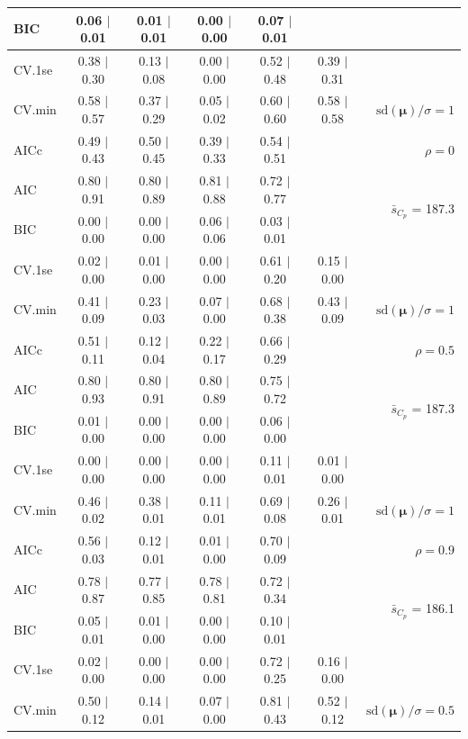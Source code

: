 \documentclass[12pt]{article}
\newcommand{\mr}[1]{\mathrm{#1}}
\newcommand{\bm}[1]{\mathbf{#1}}
\begin{document}
\begin{table}[p]
\begin{center}
\begin{tabular}{l*{5}{c}|r}
BIC & 0.06 $\mid$ 0.01 & 0.01 $\mid$ 0.01 & 0.00 $\mid$ 0.00 & 0.07 $\mid$ 0.01 & & \\
 \hline 
CV.1se & 0.38 $\mid$ 0.30 & 0.13 $\mid$ 0.08 & 0.00 $\mid$ 0.00 & 0.52 $\mid$ 0.48 & 0.39 $\mid$ 0.31 &\\
CV.min & 0.58 $\mid$ 0.57 & 0.37 $\mid$ 0.29 & 0.05 $\mid$ 0.02 & 0.60 $\mid$ 0.60 & 0.58 $\mid$ 0.58 &  $\mr{sd}(\bm{\mu})/\sigma=1$ \\
AICc & 0.49 $\mid$ 0.43 & 0.50 $\mid$ 0.45 & 0.39 $\mid$ 0.33 & 0.54 $\mid$ 0.51 & & $\rho=0$ \\
AIC & 0.80 $\mid$ 0.91 & 0.80 $\mid$ 0.89 & 0.81 $\mid$ 0.88 & 0.72 $\mid$ 0.77 & & \multirow{2}{*}{$\bar{s}_{C_p}$ = 187.3} \\
BIC & 0.00 $\mid$ 0.00 & 0.00 $\mid$ 0.00 & 0.06 $\mid$ 0.06 & 0.03 $\mid$ 0.01 & & \\
 \hline 
CV.1se & 0.02 $\mid$ 0.00 & 0.01 $\mid$ 0.00 & 0.00 $\mid$ 0.00 & 0.61 $\mid$ 0.20 & 0.15 $\mid$ 0.00 &\\
CV.min & 0.41 $\mid$ 0.09 & 0.23 $\mid$ 0.03 & 0.07 $\mid$ 0.00 & 0.68 $\mid$ 0.38 & 0.43 $\mid$ 0.09 &  $\mr{sd}(\bm{\mu})/\sigma=1$ \\
AICc & 0.51 $\mid$ 0.11 & 0.12 $\mid$ 0.04 & 0.22 $\mid$ 0.17 & 0.66 $\mid$ 0.29 & & $\rho=0.5$ \\
AIC & 0.80 $\mid$ 0.93 & 0.80 $\mid$ 0.91 & 0.80 $\mid$ 0.89 & 0.75 $\mid$ 0.72 & & \multirow{2}{*}{$\bar{s}_{C_p}$ = 187.3} \\
BIC & 0.01 $\mid$ 0.00 & 0.00 $\mid$ 0.00 & 0.00 $\mid$ 0.00 & 0.06 $\mid$ 0.00 & & \\
 \hline 
CV.1se & 0.00 $\mid$ 0.00 & 0.00 $\mid$ 0.00 & 0.00 $\mid$ 0.00 & 0.11 $\mid$ 0.01 & 0.01 $\mid$ 0.00 &\\
CV.min & 0.46 $\mid$ 0.02 & 0.38 $\mid$ 0.01 & 0.11 $\mid$ 0.01 & 0.69 $\mid$ 0.08 & 0.26 $\mid$ 0.01 &  $\mr{sd}(\bm{\mu})/\sigma=1$ \\
AICc & 0.56 $\mid$ 0.03 & 0.12 $\mid$ 0.01 & 0.01 $\mid$ 0.00 & 0.70 $\mid$ 0.09 & & $\rho=0.9$ \\
AIC & 0.78 $\mid$ 0.87 & 0.77 $\mid$ 0.85 & 0.78 $\mid$ 0.81 & 0.72 $\mid$ 0.34 & & \multirow{2}{*}{$\bar{s}_{C_p}$ = 186.1} \\
BIC & 0.05 $\mid$ 0.01 & 0.01 $\mid$ 0.00 & 0.00 $\mid$ 0.00 & 0.10 $\mid$ 0.01 & & \\
 \hline 
CV.1se & 0.02 $\mid$ 0.00 & 0.00 $\mid$ 0.00 & 0.00 $\mid$ 0.00 & 0.72 $\mid$ 0.25 & 0.16 $\mid$ 0.00 &\\
CV.min & 0.50 $\mid$ 0.12 & 0.14 $\mid$ 0.01 & 0.07 $\mid$ 0.00 & 0.81 $\mid$ 0.43 & 0.52 $\mid$ 0.12 &  $\mr{sd}(\bm{\mu})/\sigma=0.5$ \\

\end{tabular}
\end{center}
\end{table}
\end{document}
